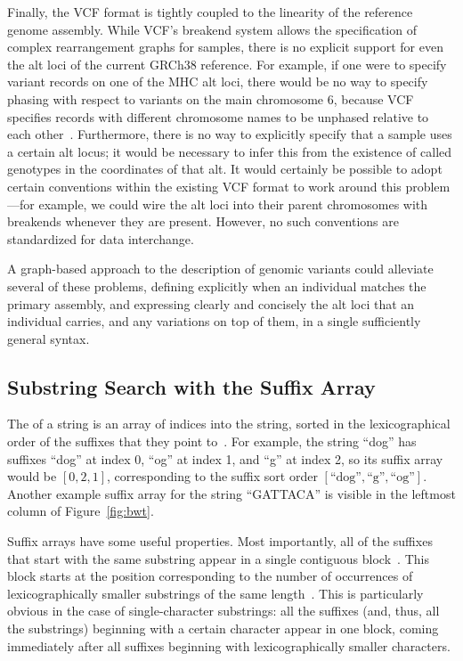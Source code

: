 Finally, the VCF format is tightly coupled to the linearity of the reference genome assembly. While VCF's breakend system allows the specification of complex rearrangement graphs for samples, there is no explicit support for even the alt loci of the current GRCh38 reference. For example, if one were to specify variant records on one of the MHC alt loci, there would be no way to specify phasing with respect to variants on the main chromosome 6, because VCF specifies records with different chromosome names to be unphased relative to each other~\cite{marshall2013variant}. Furthermore, there is no way to explicitly specify that a sample uses a certain alt locus; it would be necessary to infer this from the existence of called genotypes in the coordinates of that alt. It would certainly be possible to adopt certain conventions within the existing VCF format to work around this problem---for example, we could wire the alt loci into their parent chromosomes with breakends whenever they are present. However, no such conventions are standardized for data interchange.

A graph-based approach to the description of genomic variants could alleviate several of these problems, defining explicitly when an individual matches the primary assembly, and expressing clearly and concisely the alt loci that an individual carries, and any variations on top of them, in a single sufficiently general syntax.

\subsection{Substring Search with the Suffix Array}

The  of a string is an array of indices into the string, sorted in the lexicographical order of the suffixes that they point to~\cite{manber1993suffix}. For example, the string ``dog'' has suffixes ``dog'' at index 0, ``og'' at index 1, and ``g'' at index 2, so its suffix array would be $[0, 2, 1]$, corresponding to the suffix sort order $[\textrm{``dog''}, \textrm{``g''}, \textrm{``og''}]$. Another example suffix array for the string ``GATTACA'' is visible in the leftmost column of Figure~\ref{fig:bwt}.

Suffix arrays have some useful properties. Most importantly, all of the suffixes that start with the same substring appear in a single contiguous block~\cite{ferragina2000opportunistic}. This block starts at the position corresponding to the number of occurrences of lexicographically smaller substrings of the same length~\cite{ferragina2000opportunistic}. This is particularly obvious in the case of single-character substrings: all the suffixes (and, thus, all the substrings) beginning with a certain character appear in one block, coming immediately after all suffixes beginning with lexicographically smaller characters.

